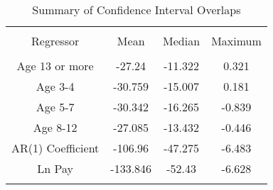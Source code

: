 
\begin{table}[!htbp] \centering 
  \caption{Summary of Confidence Interval Overlaps} 
  \label{tab:jkm} 
\begin{tabular}{@{\extracolsep{5pt}} cccc} 
\\[-1.8ex]\hline 
\hline \\[-1.8ex] 
Regressor & Mean & Median & Maximum \\ 
\hline \\[-1.8ex] 
Age 13 or more & -27.24 & -11.322 & 0.321 \\ 
Age 3-4 & -30.759 & -15.007 & 0.181 \\ 
Age 5-7 & -30.342 & -16.265 & -0.839 \\ 
Age 8-12 & -27.085 & -13.432 & -0.446 \\ 
AR(1) Coefficient & -106.96 & -47.275 & -6.483 \\ 
Ln Pay & -133.846 & -52.43 & -6.628 \\ 
\hline \\[-1.8ex] 
\end{tabular} 
\end{table} 
